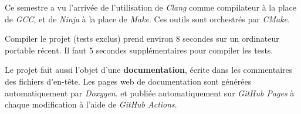 Ce semestre a vu l'arrivée de l'utilisation de \textit{Clang} comme compilateur à la place de \textit{GCC}, et de \textit{Ninja} à la place de \textit{Make}. \cite{Clang} \cite{Ninja} Ces outils sont orchestrés par \textit{CMake}. \cite{CMake}

Compiler le projet (tests exclus) prend environ 8 secondes sur un ordinateur portable récent. Il faut 5 secondes supplémentaires pour compiler les tests.

Le projet fait aussi l'objet d'une \textbf{documentation}, écrite dans les commentaires des fichiers d'en-tête. Les pages web de documentation sont générées automatiquement par \textit{Doxygen}. \cite{Doxygen} et publiée automatiquement sur \textit{GitHub Pages} à chaque modification à l'aide de \textit{GitHub Actions}. \cite{Leroy_doc}